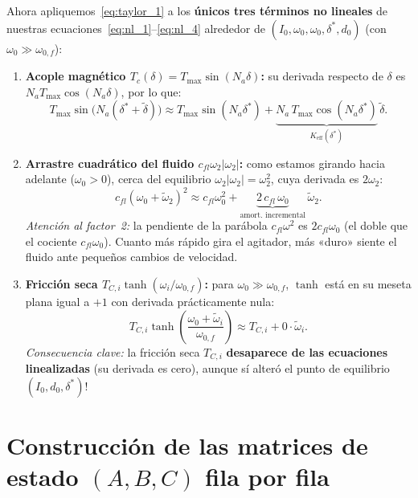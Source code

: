 \documentclass[11pt,a4paper,oneside]{book}
\begin{document}
Ahora apliquemos~\eqref{eq:taylor_1} a los \textbf{únicos tres términos no
lineales} de nuestras ecuaciones~\eqref{eq:nl_1}--\eqref{eq:nl_4} alrededor de
$(I_0, \omega_0, \omega_0, \delta^\ast, d_0)$ (con $\omega_0 \gg \omega_{0,f}$):

\begin{enumerate}
  \item \textbf{Acople magnético $T_c(\delta) = T_{\max}\sin(N_a\delta)$:}
        su derivada respecto de $\delta$ es $N_a T_{\max}\cos(N_a\delta)$, por
        lo que:
        \[
          T_{\max}\sin\big(N_a(\delta^\ast + \tilde\delta)\big)
          \approx T_{\max}\sin(N_a\delta^\ast)
          + \underbrace{N_a\,T_{\max}\cos(N_a\delta^\ast)}_{K_{\text{eff}}(\delta^\ast)}\,\tilde\delta.
        \]
  \item \textbf{Arrastre cuadrático del fluido $c_{fl}\omega_2|\omega_2|$:}
        como estamos girando hacia adelante ($\omega_0 > 0$), cerca del
        equilibrio $\omega_2|\omega_2| = \omega_2^2$, cuya derivada es
        $2\omega_2$:
        \[
          c_{fl}(\omega_0 + \tilde\omega_2)^2
          \approx c_{fl}\omega_0^2 + \underbrace{2\,c_{fl}\,\omega_0}_{\text{amort.\ incremental}}\,\tilde\omega_2.
        \]
        \emph{Atención al factor~2:} la pendiente de la parábola $c_{fl}\omega^2$
        es $2c_{fl}\omega_0$ (el doble que el cociente $c_{fl}\omega_0$). Cuanto
        más rápido gira el agitador, más «duro» siente el fluido ante pequeños
        cambios de velocidad.
  \item \textbf{Fricción seca $T_{C,i}\tanh(\omega_i/\omega_{0,f})$:}
        para $\omega_0 \gg \omega_{0,f}$, $\tanh$ está en su meseta plana igual
        a $+1$ con derivada prácticamente nula:
        \[
          T_{C,i}\tanh\!\left(\frac{\omega_0 + \tilde\omega_i}{\omega_{0,f}}\right)
          \approx T_{C,i} + 0\cdot\tilde\omega_i.
        \]
        \emph{Consecuencia clave:} la fricción seca $T_{C,i}$ \textbf{desaparece
        de las ecuaciones linealizadas} (su derivada es cero), aunque sí alteró
        el punto de equilibrio $(I_0, d_0, \delta^\ast)$!
\end{enumerate}

\section{Construcción de las matrices de estado \texorpdfstring{$(A, B, C)$}{(A, B, C)} fila por fila}
\end{document}
